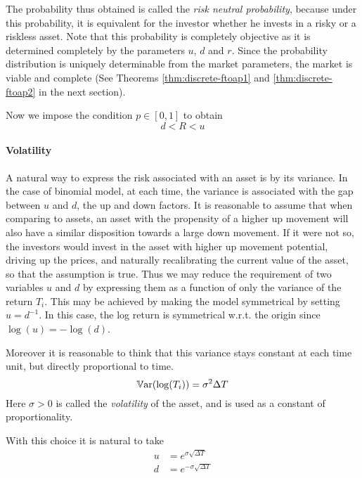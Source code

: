The probability thus obtained is called the \emph{risk neutral probability}, because under this probability, it is equivalent for the investor whether he invests in a risky or a riskless asset. Note that this probability is completely objective as it is determined completely by the parameters $ u $, $ d $ and $ r $. Since the probability distribution is uniquely determinable from the market parameters, the market is viable and complete (See Theorems \ref{thm:discrete-ftoap1} and \ref{thm:discrete-ftoap2} in the next section).

Now we impose the condition $ p \in [0,1] $ to obtain
\begin{equation}
	\label{eq:discrete-feasibility-condition}
	d < R < u
\end{equation}


\paragraph{Volatility}
A natural way to express the risk associated with an asset is by its variance. In the case of binomial model, at each time, the variance is associated with the gap between $ u $ and $ d $, the up and down factors. It is reasonable to assume that when comparing to assets, an asset with the propensity of a higher up movement will also have a similar disposition towards a large down movement. If it were not so, the investors would invest in the asset with higher up movement potential, driving up the prices, and naturally recalibrating the current value of the asset, so that the assumption is true. Thus we may reduce the requirement of two variables $ u $ and $ d $ by expressing them as a function of only the variance of the return $ T_i $. This may be achieved by making the model symmetrical by setting $ u = d^{-1} $. In this case, the log return is symmetrical w.r.t. the origin since $ \log (u) = - \log (d) $.

Moreover it is reasonable to think that this variance stays constant at each time unit, but directly proportional to time.
\begin{equation*}
	\operatorname{\mathbb{V}\mathrm{ar}}(\log(T_i)) = \sigma^2 \Delta T
\end{equation*}
Here $ \sigma > 0 $ is called the \emph{volatility} of the asset, and is used as a constant of proportionality.

With this choice it is natural to take
\begin{subequations}
	\label{eq:discrete-ud}
	\begin{align}
		u &= e^{\sigma \sqrt{\Delta T}} \\
		d &= e^{- \sigma \sqrt{\Delta T}}
	\end{align}
\end{subequations}

